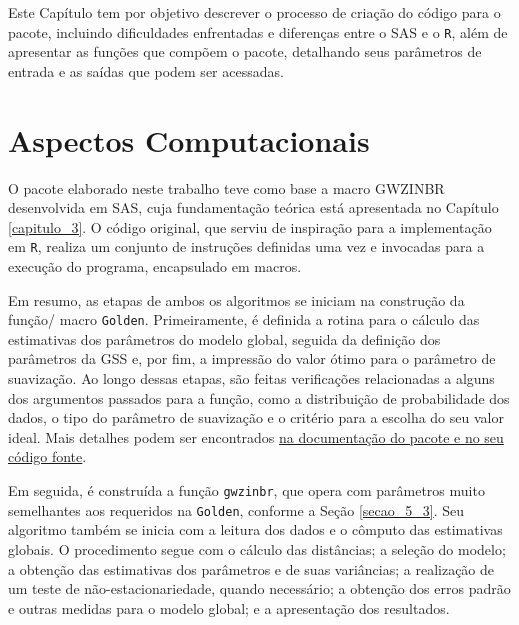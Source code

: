 \documentclass[12pt, a4paper, twoside]{report}
\numberwithin{equation}{section} %
\begin{document}
Este Capítulo tem por objetivo descrever o processo de criação do código para o pacote, incluindo dificuldades enfrentadas e diferenças entre o SAS e o \texttt{R}, além de apresentar as funções que compõem o pacote, detalhando seus parâmetros de entrada e as saídas que podem ser acessadas.


\section{Aspectos Computacionais}\label{secao_5_2}

O pacote elaborado neste trabalho teve como base a macro GWZINBR desenvolvida em SAS, cuja fundamentação teórica está apresentada no Capítulo \ref{capitulo_3}. O código original, que serviu de inspiração para a implementação em \texttt{R}, realiza um conjunto de instruções definidas uma vez e invocadas para a execução do programa, encapsulado em macros. 

Em resumo, as etapas de ambos os algoritmos se iniciam na construção da função/ macro \texttt{Golden}. Primeiramente, é definida a rotina para o cálculo das estimativas dos parâmetros do modelo global, seguida da definição dos parâmetros da GSS e, por fim, a impressão do valor ótimo para o parâmetro de suavização. Ao longo dessas etapas, são feitas verificações relacionadas a alguns dos argumentos passados para a função, como a distribuição de probabilidade dos dados, o tipo do parâmetro de suavização e o critério para a escolha do seu valor ideal. Mais detalhes podem ser encontrados \href{https://cran.r-project.org/web/packages/gwzinbr/index.html}{na documentação do pacote e no seu código fonte}.


Em seguida, é construída a função \texttt{gwzinbr}, que opera com parâmetros muito semelhantes aos requeridos na \texttt{Golden}, conforme a Seção \ref{secao_5_3}. Seu algoritmo também se inicia com a leitura dos dados e o cômputo das estimativas globais. O procedimento segue com o cálculo das distâncias; a seleção do modelo; a obtenção das estimativas dos parâmetros e de suas variâncias; a realização de um teste de não-estacionariedade, quando necessário; a obtenção dos erros padrão e outras medidas para o modelo global; e a apresentação dos resultados.  
\end{document}
